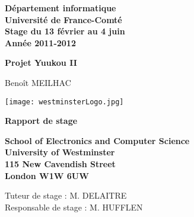 \begin{titlepage}
    \centering

    \vspace{5mm}

	\normalsize{
		\textbf{
			D\'epartement informatique\\
			Universit\'e de France-Comt\'e\\
			Stage du 13 f\'evrier au 4 juin\\
			Ann\'ee 2011-2012
		}
	}

    \vspace{5mm}
	
    \Huge{
        \textbf{
            Projet Yuukou II
        }
    }

    \vspace{5mm}

    \normalsize{
        Beno\^it MEILHAC
    }

    \vspace{5mm}
	
    \begin{center} 
        \texttt{[image: westminsterLogo.jpg]}
	\end{center}
	
    \vspace{14mm}

    \Huge{
        \textbf{
            Rapport de stage
        }
	}

	\vspace{20mm}

    \normalsize{
        \textbf{
			School of Electronics and Computer Science\\
            University of Westminster\\
        	115 New Cavendish Street\\
			London W1W 6UW\\
        }
    }

	\vspace{5mm}

	\normalsize{	
	    Tuteur de stage : M. DELAITRE\\
		Responsable de stage : M. HUFFLEN
	}

\end{titlepage}

\clearpage

